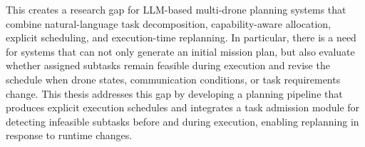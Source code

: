 This creates a research gap for LLM-based multi-drone planning systems that combine natural-language task decomposition, 
capability-aware allocation, explicit scheduling, and execution-time replanning.
In particular, there is a need for systems that can not only generate an initial mission plan, but also evaluate whether assigned subtasks 
remain feasible during execution and revise the schedule when drone states, communication conditions, or task requirements change.
This thesis addresses this gap by developing a planning pipeline that produces explicit execution schedules and integrates 
a task admission module for detecting infeasible subtasks before and during execution, enabling replanning in response to runtime changes.

